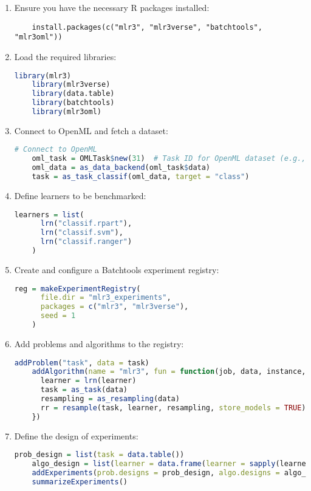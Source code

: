 \documentclass[a4paper,11pt]{article}
\begin{document}
\begin{enumerate}
    \item Ensure you have the necessary R packages installed:
    \begin{verbatim}
    install.packages(c("mlr3", "mlr3verse", "batchtools", "mlr3oml"))
    \end{verbatim}

    \item Load the required libraries:
    \begin{lstlisting}[language=R]
    library(mlr3)
    library(mlr3verse)
    library(data.table)
    library(batchtools)
    library(mlr3oml)
    \end{lstlisting}

    \item Connect to OpenML and fetch a dataset:
    \begin{lstlisting}[language=R]
    # Connect to OpenML
    oml_task = OMLTask$new(31)  # Task ID for OpenML dataset (e.g., iris dataset)
    oml_data = as_data_backend(oml_task$data)
    task = as_task_classif(oml_data, target = "class")
    \end{lstlisting}

    \item Define learners to be benchmarked:
    \begin{lstlisting}[language=R]
    learners = list(
      lrn("classif.rpart"),
      lrn("classif.svm"),
      lrn("classif.ranger")
    )
    \end{lstlisting}

    \item Create and configure a Batchtools experiment registry:
    \begin{lstlisting}[language=R]
    reg = makeExperimentRegistry(
      file.dir = "mlr3_experiments",
      packages = c("mlr3", "mlr3verse"),
      seed = 1
    )
    \end{lstlisting}

    \item Add problems and algorithms to the registry:
    \begin{lstlisting}[language=R]
    addProblem("task", data = task)
    addAlgorithm(name = "mlr3", fun = function(job, data, instance, learner) {
      learner = lrn(learner)
      task = as_task(data)
      resampling = as_resampling(data)
      rr = resample(task, learner, resampling, store_models = TRUE)
    })
    \end{lstlisting}

    \item Define the design of experiments:
    \begin{lstlisting}[language=R]
    prob_design = list(task = data.table())
    algo_design = list(learner = data.frame(learner = sapply(learners, function(x) {x$id}), stringsAsFactors = FALSE))
    addExperiments(prob.designs = prob_design, algo.designs = algo_design)
    summarizeExperiments()
    \end{lstlisting}


\end{enumerate}
\end{document}
